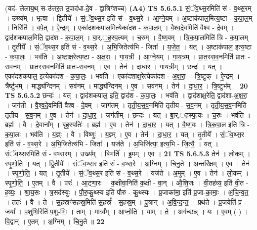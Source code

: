 \documentclass[17pt]{extarticle}
\begin{document}
                  \newline
                      (यद॑- लेलाय॒थ् स-उ॑त्तर॒त उ॒पाद॑धा-दे॒व - द्वात्रिꣳ॑शच्च)  \textbf{(A4)} \newline \newline
                                \textbf{ TS 5.6.5.1} \newline
                  सं॒ॅव॒थ्स॒रमिति॑ सं - व॒थ्स॒रम् । उख्य᳚म् । भृ॒त्वा । द्वि॒तीये᳚ । सं॒ॅव॒थ्स॒र इति॑ सं - व॒थ्स॒रे । आ॒ग्ने॒यम् । अ॒ष्टाक॑पाल॒मित्य॒ष्टा - क॒पा॒ल॒म् । निरिति॑ । व॒पे॒त् । ऐ॒न्द्रम् । एका॑दशकपाल॒मित्येका॑दश - क॒पा॒ल॒म् । वै॒श्व॒दे॒वमिति॑ वैश्व - दे॒वम् । द्वाद॑शकपाल॒मिति॒ द्वाद॑श - क॒पा॒ल॒म् । बा॒र्.॒ह॒स्प॒त्यम् । च॒रुम् । वै॒ष्ण॒वम् । त्रि॒क॒पा॒लमिति॑ त्रि - क॒पा॒लम् । तृ॒तीये᳚ । सं॒ॅव॒थ्स॒र इति॑ सं - व॒थ्स॒रे । अ॒भि॒जितेत्य॑भि - जिता᳚ । य॒जे॒त॒ । यत् । अ॒ष्टाक॑पाल॒ इत्य॒ष्टा - क॒पा॒लः॒ । भव॑ति । अ॒ष्टाक्ष॒रेत्य॒ष्टा - अ॒क्ष॒रा॒ । गा॒य॒त्री । आ॒ग्ने॒यम् । गा॒य॒त्रम् । प्रा॒त॒स्स॒व॒नमिति॑ प्रातः - स॒व॒नम् । प्रा॒त॒स्स॒व॒नमिति॑ प्रातः-स॒व॒नम् । ए॒व । तेन॑ । दा॒धा॒र॒ । गा॒य॒त्रीम् । छन्दः॑ । यत् । एका॑दशकपाल॒ इत्येका॑दश - क॒पा॒लः॒ । भव॑ति । एका॑दशाक्ष॒रेत्येका॑दश - अ॒क्ष॒रा॒ । त्रि॒ष्टुक् । ऐ॒न्द्रम् । त्रैष्टु॑भम् । माद्ध्य॑न्दिनम् । सव॑नम् । माद्ध्य॑न्दिनम् । ए॒व । सव॑नम् । तेन॑ । दा॒धा॒र॒ । त्रि॒ष्टुभ᳚म् । \textbf{  20} \newline
                  \newline
                                \textbf{ TS 5.6.5.2} \newline
                  छन्दः॑ । यत् । द्वाद॑शकपाल॒ इति॒ द्वाद॑श - क॒पा॒लः॒ । भव॑ति । द्वाद॑शाक्ष॒रेति॒ द्वाद॑शा-अ॒क्ष॒रा॒ । जग॑ती । वै॒श्व॒दे॒वमिति॑ वैश्व - दे॒वम् । जाग॑तम् । तृ॒ती॒य॒स॒व॒नमिति॑ तृतीय - स॒व॒नम् । तृ॒ती॒य॒स॒व॒नमिति॑ तृतीय - स॒व॒नम् । ए॒व । तेन॑ । दा॒धा॒र॒ । जग॑तीम् । छन्दः॑ । यत् । बा॒र्.॒ह॒स्प॒त्यः । च॒रुः । भव॑ति । ब्रह्म॑ । वै । दे॒वाना᳚म् । बृह॒स्पतिः॑ । ब्रह्म॑ । ए॒व । तेन॑ । दा॒धा॒र॒ । यत् । वै॒ष्ण॒वः । त्रि॒क॒पा॒ल इति॑ त्रि - क॒पा॒लः । भव॑ति । य॒ज्ञ्ः । वै । विष्णुः॑ । य॒ज्ञ्म् । ए॒व । तेन॑ । दा॒धा॒र॒ । यत् । तृ॒तीये᳚ । सं॒ॅव॒थ्स॒र इति॑ सं - व॒थ्स॒रे । अ॒भि॒जितेत्य॑भि - जिता᳚ । यज॑ते । अ॒भिजि॑त्या॒ इत्य॒भि - जि॒त्यै॒ । यत् । सं॒ॅव॒थ्स॒रमिति॑ सं - व॒थ्स॒रम् । उख्य᳚म् । बि॒भर्ति॑ । इ॒मम् । ए॒व । \textbf{  21} \newline
                  \newline
                                \textbf{ TS 5.6.5.3} \newline
                  तेन॑ । लो॒कम् । स्पृ॒णो॒ति॒ । यत् । द्वि॒तीये᳚ । सं॒ॅव॒थ्स॒र इति॑ सं - व॒थ्स॒रे । अ॒ग्निम् । चि॒नु॒ते । अ॒न्तरि॑क्षम् । ए॒व । तेन॑ । स्पृ॒णो॒ति॒ । यत् । तृ॒तीये᳚ । सं॒ॅव॒थ्स॒र इति॑ सं - व॒थ्स॒रे । यज॑ते । अ॒मुम् । ए॒व । तेन॑ । लो॒कम् । स्पृ॒णो॒ति॒ । ए॒तम् । वै । परः॑ । आ॒ट्णा॒रः । क॒क्षीवा॒निति॑ क॒क्षी - वा॒न् । औ॒शि॒जः । वी॒तह॑व्य॒ इति॑ वी॒त - ह॒व्यः॒ । श्रा॒य॒सः । त्र॒सद॑स्युः । पौ॒रु॒कु॒थ्स्य इति॑ पौरु - कु॒थ्स्यः । प्र॒जाका॑मा॒ इति॑ प्र॒जा-का॒माः॒ । अ॒चि॒न्व॒त॒ । ततः॑ । वै । ते । स॒हस्रꣳ॑सहस्र॒मिति॑ स॒हस्रं᳚ - स॒ह॒स्र॒म् । पु॒त्रान् । अ॒वि॒न्द॒न्त॒ । प्रथ॑ते । प्र॒जयेति॑ प्र - जया᳚ । प॒शुभि॒रिति॑ प॒शु-भिः॒ । ताम् । मात्रा᳚म् । आ॒प्नो॒ति॒ । याम् । ते॒ । अग॑च्छन्न् । यः । ए॒वम् ( ) । वि॒द्वान् । ए॒तम् । अ॒ग्निम् । चि॒नु॒ते ॥ \textbf{  22} \newline
\end{document}
